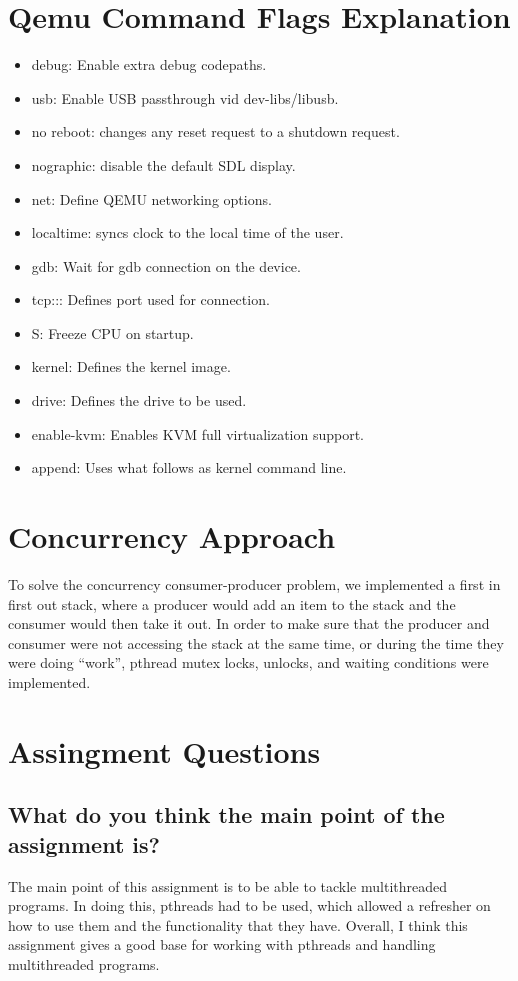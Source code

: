 \documentclass[letterpaper,onecolumn,10pt,titlepage]{IEEEtran}
\begin{document}
\section{Qemu Command Flags Explanation}
\par   
\begin{itemize}
\item debug: Enable extra debug codepaths.
\item usb: Enable USB passthrough vid dev-libs/libusb.
\item no reboot: changes any reset request to a shutdown request.
\item nographic: disable the default SDL display.
\item net: Define QEMU networking options.
\item localtime: syncs clock to the local time of the user.
\item gdb: Wait for gdb connection on the device.
\item tcp::: Defines port used for connection.
\item S: Freeze CPU on startup.
\item kernel: Defines the kernel image.
\item drive: Defines the drive to be used.
\item enable-kvm: Enables KVM full virtualization support.
\item append: Uses what follows as kernel command line.
\end{itemize}

\section{Concurrency Approach}
\par
To solve the concurrency consumer-producer problem, we implemented a first in first out stack, where a producer would add an item to the stack and the consumer would then take it out. In order to make sure that the producer and consumer were not accessing the stack at the same time, or during the time they were doing “work”, pthread mutex locks, unlocks, and waiting conditions were implemented. 
\par

\section{Assingment Questions}
\par
\subsection{What do you think the main point of the assignment is?}
\par
The main point of this assignment is to be able to tackle multithreaded programs. In doing this, pthreads had to be used, which allowed a refresher on how to use them and the functionality that they have. Overall, I think this assignment gives a good base for working with pthreads and handling multithreaded programs. 
\par
\end{document}
